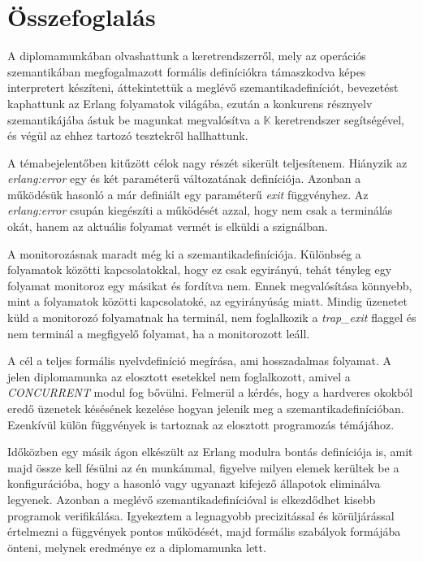 \section{Összefoglalás}
A diplomamunkában olvashattunk a keretrendszerről, mely az operációs szemantikában megfogalmazott formális definíciókra támaszkodva képes interpretert készíteni, áttekintettük a meglévő szemantikadefiníciót, bevezetést kaphattunk az Erlang folyamatok világába, ezután a konkurens résznyelv szemantikájába ástuk be magunkat megvalósítva a $\mathbb{K}$ keretrendszer segítségével, és végül az ehhez tartozó tesztekről hallhattunk.

A témabejelentőben kitűzött célok nagy részét sikerült teljesítenem. Hiányzik az \textit{erlang:error} egy és két paraméterű változatának definíciója. Azonban a működésük hasonló a már definiált egy paraméterű \textit{exit} függvényhez. Az \textit{erlang:error} csupán kiegészíti a működését azzal, hogy nem csak a terminálás okát, hanem az aktuális folyamat vermét is elküldi a szignálban.

A monitorozásnak maradt még ki a szemantikadefiníciója. Különbség a folyamatok közötti kapcsolatokkal, hogy ez csak egyirányú, tehát tényleg egy folyamat monitoroz egy másikat és fordítva nem. Ennek megvalósítása könnyebb, mint a folyamatok közötti kapcsolatoké, az egyirányúság miatt. Mindig üzenetet küld a monitorozó folyamatnak ha terminál, nem foglalkozik a \textit{trap\_exit} flaggel és nem terminál a megfigyelő folyamat, ha a monitorozott leáll.

A cél a teljes formális nyelvdefiníció megírása, ami hosszadalmas folyamat. A jelen diplomamunka az elosztott esetekkel nem foglalkozott, amivel a \textit{CONCURRENT} modul fog  bővülni. Felmerül a kérdés, hogy a hardveres okokból eredő üzenetek késésének kezelése hogyan jelenik meg a szemantikadefinícióban. Ezenkívül külön függvények is tartoznak az elosztott programozás témájához.

Időközben egy másik ágon elkészült az Erlang modulra bontás definíciója is, amit majd össze kell fésülni az én munkámmal, figyelve milyen elemek kerültek be a konfigurációba, hogy a hasonló vagy ugyanazt kifejező állapotok eliminálva legyenek. Azonban a meglévő szemantikadefinícióval is elkezdődhet kisebb programok verifikálása. Igyekeztem a legnagyobb precizitással és körüljárással értelmezni a függvények pontos működését, majd formális szabályok formájába önteni, melynek eredménye ez a diplomamunka lett.